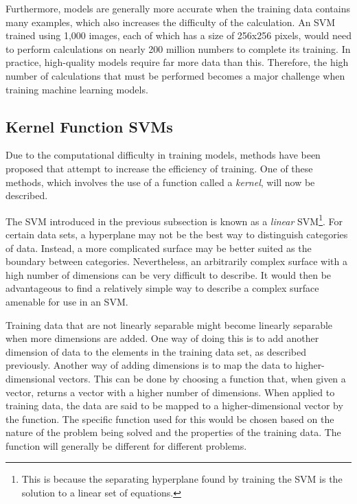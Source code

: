 \documentclass[%
 reprint,
nofootinbib,
 amsmath,amssymb,
 aps,
]{revtex4-2}
\begin{document}
Furthermore, models are generally more accurate when the training data contains many examples, which also increases the difficulty of the calculation. An SVM trained using 1,000 images, each of which has a size of 256x256 pixels, would need to perform calculations on nearly 200 million numbers to complete its training. In practice, high-quality models require far more data than this. Therefore, the high number of calculations that must be performed becomes a major challenge when training machine learning models.

\subsection{Kernel Function SVMs}

Due to the computational difficulty in training models, methods have been proposed that attempt to increase the efficiency of training. One of these methods, which involves the use of a function called a \textit{kernel}, will now be described.

The SVM introduced in the previous subsection is known as a \textit{linear} SVM\footnote{This is because the separating hyperplane found by training the SVM is the solution to a linear set of equations.}. 
For certain data sets, a hyperplane may not be the best way to distinguish categories of data.
Instead, a more complicated surface may be better suited as the boundary between categories. Nevertheless, an arbitrarily complex surface with a high number of dimensions can be very difficult to describe. It would then be advantageous to find a relatively simple way to describe a complex surface amenable for use in an SVM.

Training data that are not linearly separable might become linearly separable when more dimensions are added. One way of doing this is to add another dimension of data to the elements in the training data set, as described previously. Another way of adding dimensions is to map the data to higher-dimensional vectors. This can be done by choosing a function that, when given a vector, returns a vector with a higher number of dimensions. When applied to training data, the data are said to be mapped to a higher-dimensional vector by the function. The specific function used for this would be chosen based on the nature of the problem being solved and the properties of the training data. The function will generally be different for different problems.
\end{document}
